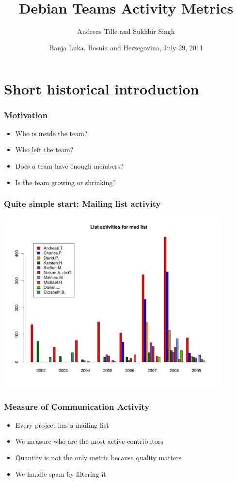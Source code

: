 \documentclass[compress]{beamer}
\title{Debian Teams Activity Metrics}
\author{Andreas Tille and Sukhbir Singh}
\institute{\link{http://www.debconf.org/debconf11/}{Debian Conference 11}}
\date{Banja Luka, Bosnia and Herzegovina, July 29, 2011}
\begin{document}
\begin{frame}
  \titlepage
\end{frame}

\section{Short historical introduction}

\begin{frame}
  \frametitle{Motivation}

  \begin{itemize}
     \item Who is inside the team?
     \item Who left the team?
     \item Does a team have enough members?
     \item Is the team growing or shrinking?
  \end{itemize}
\end{frame}

\begin{frame}
  \frametitle{Quite simple start: Mailing list activity}
      \begin{center}
        \includegraphics[width=0.9\textwidth]{authorstat_med}
      \end{center}

\end{frame}

\begin{frame}
  \frametitle{Measure of Communication Activity}

  \begin{itemize}
     \item Every project has a mailing list
     \item We measure who are the most active contributors
     \item Quantity is not the only metric because quality matters 
     \item We handle spam by filtering it
  \end{itemize}

\end{frame}
\end{document}
